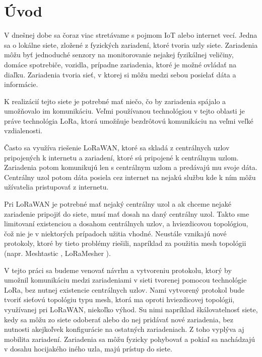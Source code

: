 \documentclass[slovak,master]{diploma}
\begin{document}
\MakeTitlePages

\listoffigures
\clearpage

\listoftables
\clearpage

\chapter{Úvod}
V dnešnej dobe sa čoraz viac stretávame s pojmom IoT alebo internet vecí. Jedna sa o lokálne siete, zložené z fyzických zariadení, ktoré tvoria uzly siete.
Zariadenia môžu byť jednoduché senzory na monitorovanie nejakej fyzikálnej veličiny, domáce spotrebiče, vozidla, prípadne 
zariadenia, ktoré je možné ovládať na diaľku. Zariadenia tvoria sieť, v ktorej si môžu medzi sebou posielať 
dáta a informácie.

K realizácií tejto siete je potrebné mať niečo, čo by zariadenia spájalo a umožňovalo im komunikáciu. Veľmi používanou technológiou
v tejto oblasti je práve technológia LoRa, ktorá umožňuje bezdrôtovú komunikáciu na veľmi veľké vzdialenosti.

Často sa využíva riešenie LoRaWAN, ktoré sa skladá z centrálnych uzlov pripojených k internetu a zariadení, ktoré sú pripojené k centrálnym uzlom. 
Zariadenia potom komunikujú len s centrálnym uzlom a predávajú mu svoje dáta. Centrálny uzol potom dáta posiela cez internet na nejakú službu kde 
k ním môžu užívatelia pristupovať z internetu.

Pri LoRaWAN je potrebné mať nejaký centrálny uzol a ak chceme nejaké zariadenie pripojiť do siete, musí mať dosah na daný centrálny uzol. 
Takto sme limitovaní existenciou a dosahom centrálnych uzlov, a hviezdicovou topológiou, čož nie je v niektorých prípadoch užitia vhodné. Neustále vznikajú nové 
protokoly, ktoré by tieto problémy riešili, napríklad za použitia mesh topológii (napr. Meshtastic \cite{meshtastic}, LoRaMesher \cite{loramesher}).

V tejto práci sa budeme venovať návrhu a vytvoreniu protokolu, ktorý by umožnil komunikáciu medzi zariadeniami v sieti tvorenej pomocou technológie LoRa,
bez nutnej existencie centrálnych uzlov. Nami vytvorený protokol bude tvoriť sieťovú topológiu typu mesh, ktorá ma oproti hviezdicovej topológii, 
využívanej pri LoRaWAN, niekoľko výhod. Su nimi napríklad škálovatelnosť siete, kedy sa môžu zo siete odoberať alebo do nej pridávať nové zariadenia, 
bez nutnosti akejkoľvek konfigurácie na ostatných zariadeniach. Z toho vyplýva aj mobilita zariadení. Zariadenia sa môžu fyzicky pohybovať a 
pokiaľ sa nachádzajú v dosahu hocijakého iného uzla, majú prístup do siete.
\end{document}
